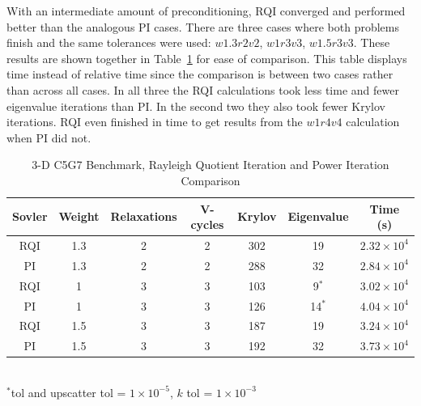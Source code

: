 \documentclass[preprint,12pt]{elsarticle}
\begin{document}
With an intermediate amount of preconditioning, RQI converged and performed better than the analogous PI cases. There are three cases where both problems finish and the same tolerances were used: $w1.3r2v2$, $w1r3v3$, $w1.5r3v3$. These results are shown together in Table~\ref{table:PI RQI} for ease of comparison. This table displays time instead of relative time since the comparison is between two cases rather than across all cases. In all three the RQI calculations took less time and fewer eigenvalue iterations than PI. In the second two they also took fewer Krylov iterations. RQI even finished in time to get results from the $w1r4v4$ calculation when PI did not. 
%
\begin{table}[!h]
\caption{3-D C5G7 Benchmark, Rayleigh Quotient Iteration and Power Iteration Comparison}
\begin{center}
\begin{tabular}{| c | c | c | c | c | c | c |}
\hline
Sovler & Weight & Relaxations & V-cycles & Krylov & Eigenvalue & Time (s) \\[0.5ex]
\hline
RQI & 1.3 & 2 & 2 & 302    & 19           & $2.32 \times 10^{4}$ \\
PI    & 1.3 & 2 & 2 & 288    & 32           & $2.84 \times 10^{4}$ \\
\hline
RQI & 1    & 3 & 3 & 103    & 9$^{*}$   & $3.02 \times 10^{4}$ \\
PI    & 1    & 3 & 3 & 126    & 14$^{*}$ & $4.04 \times 10^{4}$ \\
\hline
RQI & 1.5 & 3 & 3 & 187    & 19           & $3.24 \times 10^{4}$ \\
PI    & 1.5 & 3 & 3 & 192    & 32           & $3.73 \times 10^{4}$ \\
\hline 
\end{tabular}\\
$^{*}$tol and upscatter tol = $1 \times 10^{-5}$, $k$ tol = $1 \times 10^{-3}$
\end{center}
\label{table:PI RQI}
\end{table}  


\end{document}
